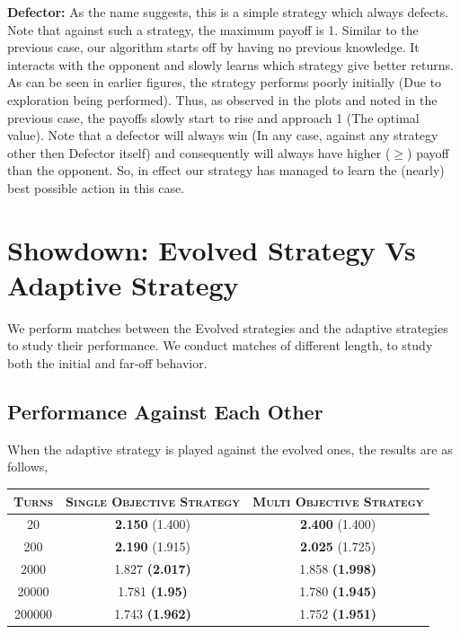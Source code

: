 \documentclass[a4paper]{article}
\begin{document}
	\noindent
	\textbf{Defector: } As the name suggests, this is a simple strategy which always defects. Note that against such a strategy, the maximum payoff is 1. 	Similar to the previous case, our algorithm starts off by having no previous knowledge. It interacts with the opponent and slowly learns which strategy give better returns. As can be seen in earlier figures, the strategy performs poorly initially (Due to exploration being performed). Thus, as observed in the plots and noted in the previous case, the payoffs slowly start to rise and approach 1 (The optimal value). Note that a defector will always win (In any case, against any strategy other then Defector itself) and consequently will always have higher ($\geq$) payoff than the opponent. So, in effect our strategy has managed to learn the (nearly) best possible action in this case.

	\section{Showdown: Evolved Strategy Vs Adaptive Strategy}

	We perform matches between the Evolved strategies and the adaptive strategies to study their performance. We conduct matches of different length, to study both the initial and far-off behavior.
	
	\subsection{Performance Against Each Other}

	When the adaptive strategy is played against the evolved ones, the results are as follows,
	
	\begin{table}[H]
	  \begin{center}
	    \begin{tabular}{|c|c|c|}
	      \toprule
	 	  \textsc{Turns} & \textsc{Single Objective Strategy} & \textsc{Multi Objective Strategy}\\
	      \midrule
		  20    & \textbf{2.150} (1.400) & \textbf{2.400} (1.400)\\		  
		  200	& \textbf{2.190} (1.915) & \textbf{2.025} (1.725)\\
		  2000  & 1.827 \textbf{(2.017)} & 1.858 \textbf{(1.998)}\\
		  20000 & 1.781 \textbf{(1.95)} & 1.780 \textbf{(1.945)}\\
		  200000 & 1.743 \textbf{(1.962)} & 1.752 \textbf{(1.951)}\\
		\bottomrule
	    \end{tabular}
	  \end{center}
	\end{table}  		
	\vspace{-5mm}
	
\end{document}
